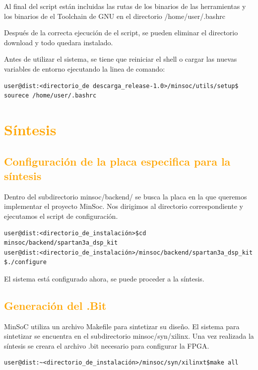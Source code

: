 Al final del script están incluidas las rutas de los binarios de las herramientas y los  binarios de el Toolchain de GNU en el directorio /home/user/.bashrc
 
Después de la correcta ejecución de el script, se pueden eliminar el directorio download y todo quedara instalado.

Antes de utilizar el sistema, se tiene que reiniciar el shell o cargar las nuevas variables de entorno ejecutando la linea de comando:

\begin{verbatim}
user@dist:<directorio_de descarga_release-1.0>/minsoc/utils/setup$ sourece /home/user/.bashrc
\end{verbatim}

\section{\textcolor{orange}{Síntesis}}

\subsection{\textcolor{orange}{Configuración de la placa especifica para la síntesis}}
Dentro del subdirectorio minsoc/backend/ se busca la placa en la que queremos implementar el proyecto MinSoc. Nos dirigimos al directorio correspondiente y ejecutamos el script de configuración.

\begin{verbatim}
user@dist:<directorio_de_instalación>$cd minsoc/backend/spartan3a_dsp_kit 
user@dist:<directorio_de_instalación>/minsoc/backend/spartan3a_dsp_kit $./configure 
\end{verbatim}

El sistema está configurado ahora, se puede proceder a la síntesis.

\subsection{\textcolor{orange}{Generación del .Bit}}

MinSoC utiliza un archivo Makefile para sintetizar su diseño. El sistema para sintetizar se encuentra en el subdirectorio minsoc/syn/xilinx. Una vez realizada la síntesis se creara el archivo .bit necesario para configurar la FPGA.

\begin{verbatim}
user@dist:~<directorio_de_instalación>/minsoc/syn/xilinxt$make all
\end{verbatim}

